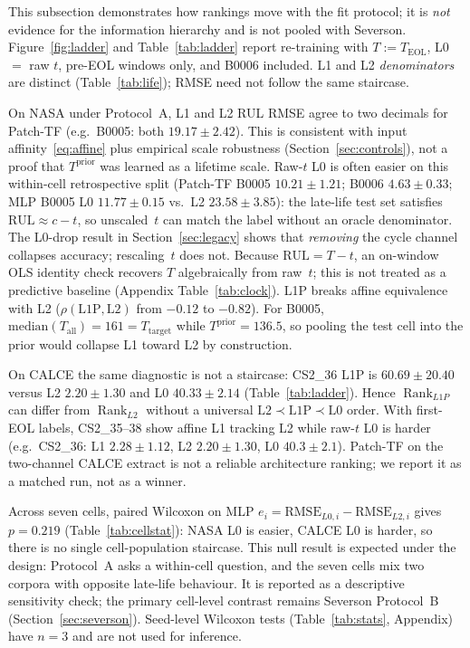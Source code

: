 \documentclass[preprint,12pt]{elsarticle}
\begin{document}
This subsection demonstrates how rankings move with the fit protocol; it is \emph{not} evidence for the information hierarchy and is not pooled with Severson.
Figure~\ref{fig:ladder} and Table~\ref{tab:ladder} report re-training with $T:=T_{\mathrm{EOL}}$, L0 $=$ raw $t$, pre-EOL windows only, and B0006 included.
L1 and L2 \emph{denominators} are distinct (Table~\ref{tab:life}); RMSE need not follow the same staircase.

On NASA under Protocol~A, L1 and L2 RUL RMSE agree to two decimals for Patch-TF (e.g.\ B0005: both $19.17\pm2.42$).
This is consistent with input affinity~\eqref{eq:affine} plus empirical scale robustness (Section~\ref{sec:controls}), not a proof that $T^{\mathrm{prior}}$ was learned as a lifetime scale.
Raw-$t$ L0 is often easier on this within-cell retrospective split (Patch-TF B0005 $10.21\pm1.21$; B0006 $4.63\pm0.33$; MLP B0005 L0 $11.77\pm0.15$ vs.\ L2 $23.58\pm3.85$): the late-life test set satisfies $\mathrm{RUL}\approx c-t$, so unscaled~$t$ can match the label without an oracle denominator.
The L0-drop result in Section~\ref{sec:legacy} shows that \emph{removing} the cycle channel collapses accuracy; rescaling~$t$ does not.
Because $\mathrm{RUL}=T-t$, an on-window OLS identity check recovers $T$ algebraically from raw~$t$; this is not treated as a predictive baseline (Appendix Table~\ref{tab:clock}).
L1P breaks affine equivalence with L2 ($\rho(\mathrm{L1P},\mathrm{L2})$ from $-0.12$ to $-0.82$).
For B0005, $\mathrm{median}(T_{\mathrm{all}})=161=T_{\mathrm{target}}$ while $T^{\mathrm{prior}}=136.5$, so pooling the test cell into the prior would collapse L1 toward L2 by construction.

On CALCE the same diagnostic is not a staircase: CS2\_36 L1P is $60.69\pm20.40$ versus L2 $2.20\pm1.30$ and L0 $40.33\pm2.14$ (Table~\ref{tab:ladder}).
Hence $\operatorname{Rank}_{L1P}$ can differ from $\operatorname{Rank}_{L2}$ without a universal $\mathrm{L2}\prec\mathrm{L1P}\prec\mathrm{L0}$ order.
With first-EOL labels, CS2\_35--38 show affine L1 tracking L2 while raw-$t$ L0 is harder (e.g.\ CS2\_36: L1 $2.28\pm1.12$, L2 $2.20\pm1.30$, L0 $40.3\pm2.1$).
Patch-TF on the two-channel CALCE extract is not a reliable architecture ranking; we report it as a matched run, not as a winner.

Across seven cells, paired Wilcoxon on MLP $e_i=\mathrm{RMSE}_{L0,i}-\mathrm{RMSE}_{L2,i}$ gives $p=0.219$ (Table~\ref{tab:cellstat}): NASA L0 is easier, CALCE L0 is harder, so there is no single cell-population staircase.
This null result is expected under the design: Protocol~A asks a within-cell question, and the seven cells mix two corpora with opposite late-life behaviour.
It is reported as a descriptive sensitivity check; the primary cell-level contrast remains Severson Protocol~B (Section~\ref{sec:severson}).
Seed-level Wilcoxon tests (Table~\ref{tab:stats}, Appendix) have $n=3$ and are not used for inference.
\end{document}
